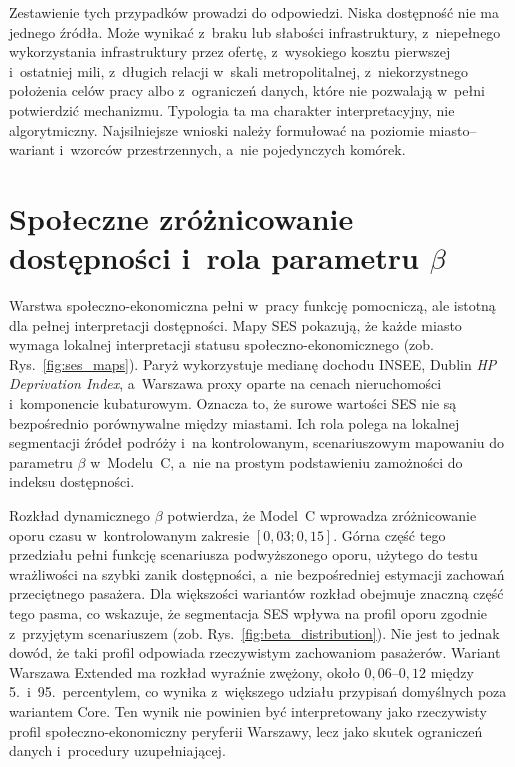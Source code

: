 \documentclass{pracamgr}
\begin{document}
Zestawienie tych przypadków prowadzi do odpowiedzi. Niska dostępność nie ma jednego źródła. Może wynikać z~braku lub słabości infrastruktury, z~niepełnego wykorzystania infrastruktury przez ofertę, z~wysokiego kosztu pierwszej i~ostatniej mili, z~długich relacji w~skali metropolitalnej, z~niekorzystnego położenia celów pracy albo z~ograniczeń danych, które nie pozwalają w~pełni potwierdzić mechanizmu. Typologia ta ma charakter interpretacyjny, nie algorytmiczny. Najsilniejsze wnioski należy formułować na poziomie miasto--wariant i~wzorców przestrzennych, a~nie pojedynczych komórek.

\section{Społeczne zróżnicowanie dostępności i~rola parametru $\beta$}\label{section:ch5_spoleczne_zroznicowanie}

Warstwa społeczno-ekonomiczna pełni w~pracy funkcję pomocniczą, ale istotną dla pełnej interpretacji dostępności. Mapy \mbox{SES} pokazują, że każde miasto wymaga lokalnej interpretacji statusu społeczno-ekonomicznego (zob. Rys.~\ref{fig:ses_maps}). Paryż wykorzystuje medianę dochodu \mbox{INSEE}, Dublin \textit{HP Deprivation Index}, a~Warszawa proxy oparte na cenach nieruchomości i~komponencie kubaturowym. Oznacza to, że surowe wartości \mbox{SES} nie są bezpośrednio porównywalne między miastami. Ich rola polega na lokalnej segmentacji źródeł podróży i~na kontrolowanym, scenariuszowym mapowaniu do parametru $\beta$ w~Modelu~C, a~nie na prostym podstawieniu zamożności do indeksu dostępności.

Rozkład dynamicznego $\beta$ potwierdza, że Model~C wprowadza zróżnicowanie oporu czasu w~kontrolowanym zakresie $[0{,}03; 0{,}15]$. Górna część tego przedziału pełni funkcję scenariusza podwyższonego oporu, użytego do testu wrażliwości na szybki zanik dostępności, a~nie bezpośredniej estymacji zachowań przeciętnego pasażera. Dla większości wariantów rozkład obejmuje znaczną część tego pasma, co wskazuje, że segmentacja \mbox{SES} wpływa na profil oporu zgodnie z~przyjętym scenariuszem (zob. Rys.~\ref{fig:beta_distribution}). Nie jest to jednak dowód, że taki profil odpowiada rzeczywistym zachowaniom pasażerów. Wariant Warszawa Extended ma rozkład wyraźnie zwężony, około $0{,}06$--$0{,}12$ między 5.~i~95.~percentylem, co wynika z~większego udziału przypisań domyślnych poza wariantem \mbox{Core}. Ten wynik nie powinien być interpretowany jako rzeczywisty profil społeczno-ekonomiczny peryferii Warszawy, lecz jako skutek ograniczeń danych i~procedury uzupełniającej.
\end{document}

